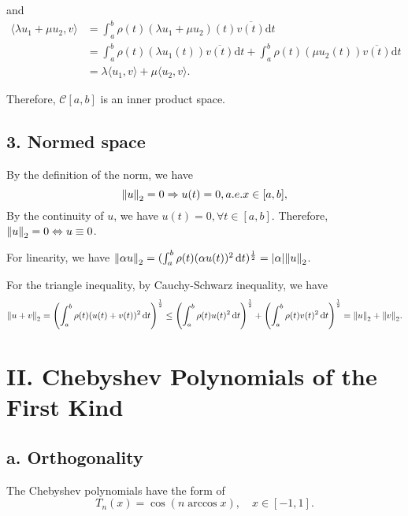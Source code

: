\documentclass[a4paper]{article}
\begin{document}
and 
\begin{equation}
    \begin{aligned}
        \langle \lambda u_1 + \mu u_2, v \rangle &= \int_a^b \rho (t) (\lambda u_1 + \mu u_2)(t) \overline{v(t)} \mathrm{d}t \\
        &= \int_a^b \rho (t) (\lambda u_1(t)) \overline{v(t)} \mathrm{d} t + \int_a^b \rho (t) (\mu u_2(t)) \overline{v(t)} \mathrm{d} t \\
        &= \lambda \langle u_1, v \rangle + \mu \langle u_2, v \rangle.
    \end{aligned}
\end{equation}  

Therefore, $\mathcal{C} [a,b]$ is an inner product space.

\subsection*{3. Normed space}

By the definition of the norm, we have
\begin{equation}
    \norm{u}_2 = 0 \Rightarrow u(t) = 0, a.e. x \in [a,b],
\end{equation}
By the continuity of $u$, we have $u(t) = 0, \forall t \in [a,b]$. Therefore, $\norm{u}_2 = 0 \Leftrightarrow u\equiv 0$.

For linearity, we have $\norm{\alpha u}_2 = ( \int_{a}^{b} \rho(t) (\alpha u(t))^2 \,\mathrm{d}t )^{\frac{1}{2}} = \abs{\alpha} \norm{u}_2$. 

For the triangle inequality, by Cauchy-Schwarz inequality, we have
\begin{equation}
    \norm{u+v}_2 = \left( \int_{a}^{b} \rho(t) (u(t)+v(t))^2 \,\mathrm{d}t \right)^{\frac{1}{2}} \leq \left( \int_{a}^{b} \rho(t) u(t)^2 \,\mathrm{d}t \right)^{\frac{1}{2}} + \left( \int_{a}^{b} \rho(t) v(t)^2 \,\mathrm{d}t \right)^{\frac{1}{2}} = \norm{u}_2 + \norm{v}_2.
\end{equation}


\section*{II. Chebyshev Polynomials of the First Kind}

\subsection*{a. Orthogonality}

The Chebyshev polynomials have the form of 
\begin{equation}
    T_n(x) = \cos(n \arccos x), \quad x \in [-1,1].
\end{equation}
\end{document}
